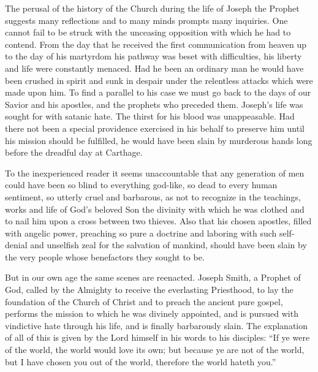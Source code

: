 The perusal of the history of the Church during the life of Joseph the Prophet suggests many
reflections and to many minds prompts many inquiries. One cannot fail to be struck with the
unceasing opposition with which he had to contend. From the day that he received the first
communication from heaven up to the day of his martyrdom his pathway was beset with
difficulties, his liberty and life were constantly menaced. Had he been an ordinary man he
would have been crushed in spirit and sunk in despair under the relentless attacks which were
made upon him. To find a parallel to his case we must go back to the days of our Savior and
his apostles, and the prophets who preceded them. Joseph's life was sought for with satanic
hate. The thirst for his blood was unappeasable. Had there not been a special providence
exercised in his behalf to preserve him until his mission should be fulfilled, he would have
been slain by murderous hands long before the dreadful day at Carthage.

To the inexperienced reader it seems unaccountable that any generation of men could have
been so blind to everything god-like, so dead to every human sentiment, so utterly cruel and
barbarous, as not to recognize in the teachings, works and life of God's beloved Son the
divinity with which he was clothed and to nail him upon a cross between two thieves. Also
that his chosen apostles, filled with angelic power, preaching so pure a doctrine and laboring
with such self-denial and unselfish zeal for the salvation of mankind, should have been slain
by the very people whose benefactors they sought to be.

But in our own age the same scenes are reenacted. Joseph Smith, a Prophet of God, called by
the Almighty to receive the everlasting Priesthood, to lay the foundation of the Church of
Christ and to preach the ancient pure gospel, performs the mission to which he was divinely
appointed, and is pursued with vindictive hate through his life, and is finally barbarously
slain. The explanation of all of this is given by the Lord himself in his words to his disciples:
``If ye were of the world, the world would love its own; but because ye are not of the world,
but I have chosen you out of the world, therefore the world hateth you.''

